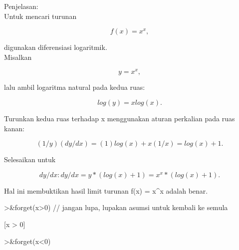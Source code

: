 \documentclass[a4paper,10pt]{article}
\begin{document}
\begin{eulernotebook}
\begin{eulercomment}
\begin{eulercomment}
\begin{eulercomment}
\begin{eulercomment}
\begin{eulercomment}
Penjelasan:\\
Untuk mencari turunan\\
\end{eulercomment}
\begin{eulerformula}
\[
f(x) = x^x,
\]
\end{eulerformula}
\begin{eulercomment}
digunakan diferensiasi logaritmik.\\
Misalkan\\
\end{eulercomment}
\begin{eulerformula}
\[
y = x^x,
\]
\end{eulerformula}
\begin{eulercomment}
lalu ambil logaritma natural pada kedua ruas:\\
\end{eulercomment}
\begin{eulerformula}
\[
log(y) = x  log(x).
\]
\end{eulerformula}
\begin{eulercomment}
Turunkan kedua ruas terhadap x menggunakan aturan perkalian pada ruas
kanan:\\
\end{eulercomment}
\begin{eulerformula}
\[
(1/y) (dy/dx) = (1)  log(x) + x  (1/x) = log(x) + 1.
\]
\end{eulerformula}
\begin{eulercomment}
Selesaikan untuk\\
\end{eulercomment}
\begin{eulerformula}
\[
dy/dx: dy/dx = y * (log(x) + 1) = x^x * (log(x) + 1).
\]
\end{eulerformula}
\begin{eulercomment}
Hal ini membuktikan hasil limit turunan f(x) = x\textasciicircum{}x adalah benar.
\end{eulercomment}
\begin{eulerprompt}
>&forget(x>0) // jangan lupa, lupakan asumsi untuk kembali ke semula
\end{eulerprompt}
\begin{euleroutput}
  
                                 [x > 0]
  
\end{euleroutput}
\begin{eulerprompt}
>&forget(x<0)
\end{eulerprompt}
\begin{euleroutput}
  

\end{euleroutput}
\end{eulercomment}
\end{eulercomment}
\end{eulercomment}
\end{eulercomment}
\end{eulernotebook}
\end{document}
